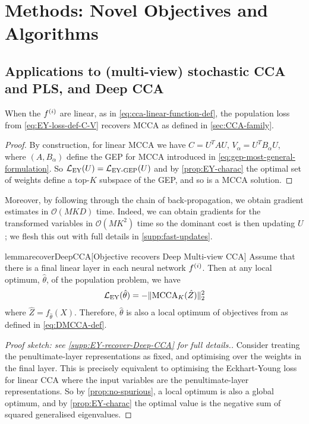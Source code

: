 \section{Methods: Novel Objectives and Algorithms}\label{sec:contributions}

\subsection{Applications to (multi-view) stochastic CCA and PLS, and Deep CCA}
\begin{lemma}
    When the $f^{(i)}$ are linear, as in \cref{eq:cca-linear-function-def}, the population loss from \cref{eq:EY-loss-def-C-V} recovers MCCA as defined in \cref{sec:CCA-family}. %
\end{lemma}
\begin{proof}
    By construction, for linear MCCA we have $C = U^T A U,\, V_\alpha=U^T B_\alpha U$, where $(A, B_\alpha)$ define the GEP for MCCA introduced in \cref{eq:gep-most-general-formulation}.
    So $\mathcal{L}_\text{EY}(U) = \mathcal{L}_\text{EY-GEP}(U)$ and by \cref{prop:EY-charac} the optimal set of weights define a top-$K$ subspace of the GEP, and so is a MCCA solution.
\end{proof}

Moreover, by following through the chain of back-propagation, we obtain gradient estimates in $\mathcal{O}(MKD)$ time.
Indeed, we can obtain gradients for the transformed variables in $\mathcal{O}(M K^2)$ time so the dominant cost is then updating $U$; we flesh this out with full details in \cref{supp:fast-updates}.

\begin{restatable}{lemma}{recoverDeepCCA}[Objective recovers Deep Multi-view CCA]\label{lem:recover-DeepCCA}
Assume that there is a final linear layer in each neural network $f^{(i)}$.
Then at any local optimum, $\hat{\theta}$, of the population problem, we have
\begin{align*}
    \mathcal{L}_\text{EY}(\hat{\theta}) = - \lVert\operatorname{MCCA}_K(\hat{Z})\rVert_2^2
\end{align*}
where $\hat{Z} = f_{\hat{\theta}}(X)$.
Therefore, $\hat{\theta}$ is also a local optimum of objectives from \cite{andrew2013deep, somandepalli2019multimodal} as defined in \cref{eq:DMCCA-def}.
\end{restatable}
\begin{proof}[Proof sketch: see \cref{supp:EY-recover-Deep-CCA} for full details.]
    Consider treating the penultimate-layer representations as fixed, and optimising over the weights in the final layer. This is precisely equivalent to optimising the Eckhart-Young loss for linear CCA where the input variables are the penultimate-layer representations. So by \cref{prop:no-spurious}, a local optimum is also a global optimum, and by \cref{prop:EY-charac} the optimal value is the negative sum of squared generalised eigenvalues.
\end{proof}


